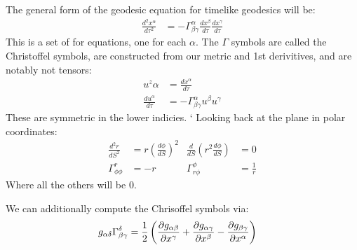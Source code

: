 The general form of the geodesic equation for timelike geodesics will be:
\begin{align*}
	\frac{d^2x^\alpha}{d\tau^2} &= -\Gamma_{\beta\gamma}^\alpha \frac{dx^\beta}{d\tau} \frac{dx^\gamma}{d\tau}
\end{align*}
This is a set of for equations, one for each $\alpha$. The $\Gamma$ symbols are called the Christoffel symbols, are constructed from our metric and 1st derivitives, and are notably not tensors:
\begin{align*}
	u^z\alpha &= \frac{dx^\alpha}{d\tau} \\
	\frac{du^\alpha}{d\tau} &= -\Gamma_{\beta\gamma}^\alpha u^\beta u^\gamma
\end{align*}
These are symmetric in the lower indicies.
`
Looking back at the plane in polar coordinates:
\begin{align*}
	\frac{d^2 r}{dS^2} &= r \left(\frac{d\phi}{dS}\right)^2 &
	\frac{d}{dS} \left(r^2 \frac{d\phi}{dS} \right) &= 0 \\
	\Gamma_{\phi\phi}^r &= -r &
	\Gamma_{r\phi}^\phi &= \frac{1}{r}
\end{align*}
Where all the others will be 0.

We can additionally compute the Chrisoffel symbols via:
\begin{align*}
	g_{\alpha\delta}\Gamma_{\beta\gamma}^\delta &= \frac{1}{2}\left(\frac{\partial g_{\alpha\beta}}{\partial x^\gamma} + \frac{\partial g_{\alpha\gamma}}{\partial x^\beta} - \frac{\partial g_{\beta\gamma}}{\partial x^\alpha}\right)
\end{align*}
